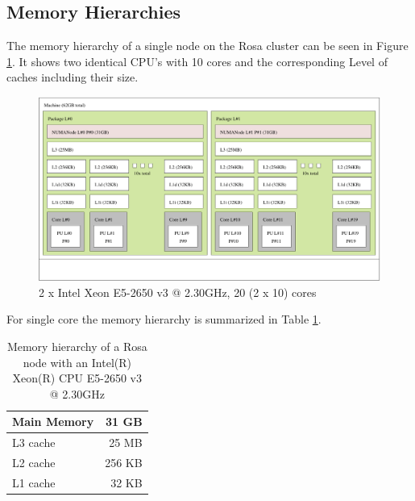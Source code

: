 \subsection{Memory Hierarchies}
The memory hierarchy of a single node on the Rosa cluster can be seen in Figure \ref{fig:node}. It shows two identical CPU's with 10 cores and the corresponding Level of caches including their size.
\begin{figure}[H]
	\centering
	\includegraphics[width=\textwidth]{../media/XEON_E5-2650.pdf}
	\caption{2 x Intel Xeon E5-2650 v3 @ 2.30GHz, 20 (2 x 10) cores}
	\label{fig:node}
\end{figure}
For single core the memory hierarchy is summarized in Table \ref{tab:cache}.
\begin{table}[H]
	\centering
	\begin{tabular}{|l|r|}
		\hline
		Main Memory & 31 GB  \\ \hline
		L3 cache    & 25 MB  \\ \hline
		L2 cache    & 256 KB \\ \hline
		L1 cache    & 32 KB  \\ \hline
	\end{tabular}
	\caption{Memory hierarchy of a Rosa node with an Intel(R) Xeon(R) CPU E5-2650 v3 @ 2.30GHz}
	\label{tab:cache}
\end{table}

